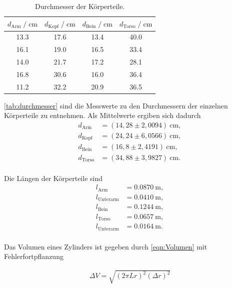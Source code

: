 \begin{table}
  \centering
    \caption{Durchmesser der Körperteile.}
    \label{tab:durchmesser}
    \begin{tabular}{c c c c}
    \toprule
    $d_\text{Arm} \;/\; \si{\centi\meter}$ & $d_\text{Kopf} \;/\; \si{\centi\meter}$ & $d_\text{Bein} \;/\; \si{\centi\meter}$ & $d_\text{Torso} \;/\; \si{\centi\meter}$ \\
    \midrule
    13.3 & 17.6 & 13.4 & 40.0 \\
    16.1 & 19.0 & 16.5 & 33.4 \\
    14.0 & 21.7 & 17.2 & 28.1 \\
    16.8 & 30.6 & 16.0 & 36.4 \\
    11.2 & 32.2 & 20.9 & 36.5 \\
    \bottomrule
  \end{tabular}
\end{table}


\autoref{tab:durchmesser} sind die Messwerte zu den Durchmessern der einzelnen Körperteile zu entnehmen. Als Mittelwerte ergiben sich dadurch
\begin{align*}
  d_{\text{Arm}} &= (14,28 \pm 2,0094)\: \si{\centi\meter}, \\
  d_{\text{Kopf}} &= (24,24 \pm 6,0566)\: \si{\centi\meter}, \\
  d_{\text{Bein}} &= (16,8 \pm 2,4191)\: \si{\centi\meter}, \\
  d_{\text{Torso}} &= (34,88 \pm 3,9827)\: \si{\centi\meter}. \\ 
\end{align*}

Die Längen der Körperteile sind
\begin{align*}
  l_{\text{Arm}} &= \SI{0,0870}{\meter}, \\
  l_{\text{Unterarm}} &= \SI{0,0410}{\meter}, \\
  l_{\text{Bein}} &= \SI{0,1244}{\meter}, \\
  l_{\text{Torso}} &= \SI{0,0657}{\meter}, \\
  l_{\text{Unterarm}} &= \SI{0,0164}{\meter}. \\
\end{align*}

Das Volumen eines Zylinders ist gegeben durch \autoref{eqn:Volumen} mit Fehlerfortpflanzung

\begin{align*}
  \Delta V = \sqrt{(2 \pi Lr)^2 (\Delta r)^2}
\end{align*}


